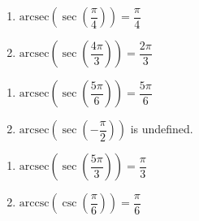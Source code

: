 \begin{multicols}{2}

\begin{enumerate}

\setcounter{enumi}{\value{HW}}

\item  $\text{arcsec}\left(\sec\left(\dfrac{\pi}{4}\right) \right) = \dfrac{\pi}{4}$ 
\item  $\text{arcsec}\left(\sec\left(\dfrac{4\pi}{3}\right) \right) = \dfrac{2\pi}{3}$

\setcounter{HW}{\value{enumi}}

\end{enumerate}

\end{multicols}

\begin{multicols}{2}

\begin{enumerate}

\setcounter{enumi}{\value{HW}}

\item  $\text{arcsec}\left(\sec\left( \dfrac{5\pi}{6} \right) \right) = \dfrac{5\pi}{6}$
\item  $\text{arcsec}\left(\sec\left(-\dfrac{\pi}{2} \right) \right)$ is undefined. 

\setcounter{HW}{\value{enumi}}

\end{enumerate}

\end{multicols}

\begin{multicols}{2}

\begin{enumerate}

\setcounter{enumi}{\value{HW}}

\item  $\text{arcsec}\left(\sec\left(\dfrac{5\pi}{3}\right) \right) = \dfrac{\pi}{3}$
\item  $\text{arccsc}\left(\csc\left(\dfrac{\pi}{6}\right) \right) = \dfrac{\pi}{6}$ 

\setcounter{HW}{\value{enumi}}

\end{enumerate}

\end{multicols}

